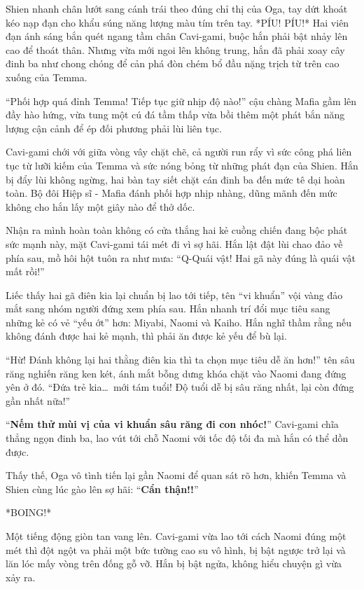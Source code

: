 \documentclass[../main.tex]{subfiles}
\begin{document}
Shien nhanh chân lướt sang cánh trái theo đúng chỉ thị của Oga, tay dứt khoát kéo nạp đạn cho khẩu súng năng lượng màu tím trên tay. *PÍU! PÍU!* Hai viên đạn ánh sáng bắn quét ngang tầm chân Cavi-gami, buộc hắn phải bật nhảy lên cao để thoát thân. Nhưng vừa mới ngoi lên không trung, hắn đã phải xoay cây đinh ba như chong chóng để cản phá đòn chém bổ đầu nặng trịch từ trên cao xuống của Temma.

``Phối hợp quá đỉnh Temma! Tiếp tục giữ nhịp độ nào!'' cậu chàng Mafia gầm lên đầy hào hứng, vừa tung một cú đá tầm thấp vừa bồi thêm một phát bắn năng lượng cận cảnh để ép đối phương phải lùi liên tục.

Cavi-gami chới với giữa vòng vây chặt chẽ, cả người run rẩy vì sức công phá liên tục từ lưỡi kiếm của Temma và sức nóng bỏng từ những phát đạn của Shien. Hắn bị đẩy lùi không ngừng, hai bàn tay siết chặt cán đinh ba đến mức tê dại hoàn toàn. Bộ đôi Hiệp sĩ - Mafia đánh phối hợp nhịp nhàng, dũng mãnh đến mức không cho hắn lấy một giây nào để thở dốc.

Nhận ra mình hoàn toàn không có cửa thắng hai kẻ cuồng chiến đang bộc phát sức mạnh này, mặt Cavi-gami tái mét đi vì sợ hãi. Hắn lật đật lùi chao đảo về phía sau, mồ hôi hột tuôn ra như mưa: ``Q-Quái vật! Hai gã này đúng là quái vật mất rồi!''

Liếc thấy hai gã điên kia lại chuẩn bị lao tới tiếp, tên ``vi khuẩn'' vội vàng đảo mắt sang nhóm người đứng xem phía sau. Hắn nhanh trí đổi mục tiêu sang những kẻ có vẻ ``yếu ớt'' hơn: Miyabi, Naomi và Kaiho. Hắn nghĩ thầm rằng nếu không đánh được hai kẻ mạnh, thì phải ăn được kẻ yếu để bù lại.

``Hừ! Đánh không lại hai thằng điên kia thì ta chọn mục tiêu dễ ăn hơn!'' tên sâu răng nghiến răng ken két, ánh mắt bỗng dưng khóa chặt vào Naomi đang đứng yên ở đó. ``Đứa trẻ kia\dots\ mới tám tuổi! Độ tuổi dễ bị sâu răng nhất, lại còn đứng gần nhất nữa!''

``\textbf{Nếm thử mùi vị của vi khuẩn sâu răng đi con nhóc!}'' Cavi-gami chĩa thẳng ngọn đinh ba, lao vút tới chỗ Naomi với tốc độ tối đa mà hắn có thể dồn được.

Thấy thế, Oga vô tình tiến lại gần Naomi để quan sát rõ hơn, khiến Temma và Shien cùng lúc gào lên sợ hãi: ``\textbf{Cẩn thận!!}''

*BOING!*

Một tiếng động giòn tan vang lên. Cavi-gami vừa lao tới cách Naomi đúng một mét thì đột ngột va phải một bức tường cao su vô hình, bị bật ngược trở lại và lăn lóc mấy vòng trên đống gỗ vỡ. Hắn bị bật ngửa, không hiểu chuyện gì vừa xảy ra.
\end{document}
